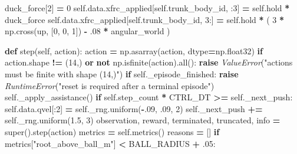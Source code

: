\documentclass[
  chinese,
  11pt,
  letterpaper,
]{article}
\newenvironment{Shaded}{\begin{snugshade}}{\end{snugshade}}
\newcommand{\BuiltInTok}[1]{#1}
\newcommand{\ControlFlowTok}[1]{\textcolor[rgb]{0.13,0.29,0.53}{\textbf{#1}}}
\newcommand{\DecValTok}[1]{\textcolor[rgb]{0.00,0.00,0.81}{#1}}
\newcommand{\FloatTok}[1]{\textcolor[rgb]{0.00,0.00,0.81}{#1}}
\newcommand{\KeywordTok}[1]{\textcolor[rgb]{0.13,0.29,0.53}{\textbf{#1}}}
\newcommand{\NormalTok}[1]{#1}
\newcommand{\OperatorTok}[1]{\textcolor[rgb]{0.81,0.36,0.00}{\textbf{#1}}}
\newcommand{\PreprocessorTok}[1]{\textcolor[rgb]{0.56,0.35,0.01}{\textit{#1}}}
\newcommand{\StringTok}[1]{\textcolor[rgb]{0.31,0.60,0.02}{#1}}
\newcommand{\VariableTok}[1]{\textcolor[rgb]{0.00,0.00,0.00}{#1}}
\renewenvironment{Shaded}{\par\smallskip}{\par\smallskip}
\begin{document}
\begin{Shaded}
\begin{Highlighting}[]
\NormalTok{        duck\_force[}\DecValTok{2}\NormalTok{] }\OperatorTok{=} \DecValTok{0}
        \VariableTok{self}\NormalTok{.data.xfrc\_applied[}\VariableTok{self}\NormalTok{.trunk\_body\_id, :}\DecValTok{3}\NormalTok{] }\OperatorTok{=} \VariableTok{self}\NormalTok{.hold }\OperatorTok{*}\NormalTok{ duck\_force}
        \VariableTok{self}\NormalTok{.data.xfrc\_applied[}\VariableTok{self}\NormalTok{.trunk\_body\_id, }\DecValTok{3}\NormalTok{:] }\OperatorTok{=} \VariableTok{self}\NormalTok{.hold }\OperatorTok{*}\NormalTok{ (}
            \DecValTok{3} \OperatorTok{*}\NormalTok{ np.cross(up, [}\DecValTok{0}\NormalTok{, }\DecValTok{0}\NormalTok{, }\DecValTok{1}\NormalTok{]) }\OperatorTok{{-}} \FloatTok{.08} \OperatorTok{*}\NormalTok{ angular\_world}
\NormalTok{        )}

    \KeywordTok{def}\NormalTok{ step(}\VariableTok{self}\NormalTok{, action):}
\NormalTok{        action }\OperatorTok{=}\NormalTok{ np.asarray(action, dtype}\OperatorTok{=}\NormalTok{np.float32)}
        \ControlFlowTok{if}\NormalTok{ action.shape }\OperatorTok{!=}\NormalTok{ (}\DecValTok{14}\NormalTok{,) }\KeywordTok{or} \KeywordTok{not}\NormalTok{ np.isfinite(action).}\BuiltInTok{all}\NormalTok{():}
            \ControlFlowTok{raise} \PreprocessorTok{ValueError}\NormalTok{(}\StringTok{"actions must be finite with shape (14,)"}\NormalTok{)}
        \ControlFlowTok{if} \VariableTok{self}\NormalTok{.\_episode\_finished:}
            \ControlFlowTok{raise} \PreprocessorTok{RuntimeError}\NormalTok{(}\StringTok{"reset is required after a terminal episode"}\NormalTok{)}
        \VariableTok{self}\NormalTok{.\_apply\_assistance()}
        \ControlFlowTok{if} \VariableTok{self}\NormalTok{.step\_count }\OperatorTok{*}\NormalTok{ CTRL\_DT }\OperatorTok{\textgreater{}=} \VariableTok{self}\NormalTok{.\_next\_push:}
            \VariableTok{self}\NormalTok{.data.qvel[:}\DecValTok{2}\NormalTok{] }\OperatorTok{=} \VariableTok{self}\NormalTok{.\_rng.uniform(}\OperatorTok{{-}}\FloatTok{.09}\NormalTok{, }\FloatTok{.09}\NormalTok{, }\DecValTok{2}\NormalTok{)}
            \VariableTok{self}\NormalTok{.\_next\_push }\OperatorTok{+=} \VariableTok{self}\NormalTok{.\_rng.uniform(}\FloatTok{1.5}\NormalTok{, }\DecValTok{3}\NormalTok{)}
\NormalTok{        observation, reward, terminated, truncated, info }\OperatorTok{=} \BuiltInTok{super}\NormalTok{().step(action)}
\NormalTok{        metrics }\OperatorTok{=} \VariableTok{self}\NormalTok{.metrics()}
\NormalTok{        reasons }\OperatorTok{=}\NormalTok{ []}
        \ControlFlowTok{if}\NormalTok{ metrics[}\StringTok{"root\_above\_ball\_m"}\NormalTok{] }\OperatorTok{\textless{}}\NormalTok{ BALL\_RADIUS }\OperatorTok{+} \FloatTok{.05}\NormalTok{:}

\end{Highlighting}
\end{Shaded}
\end{document}
